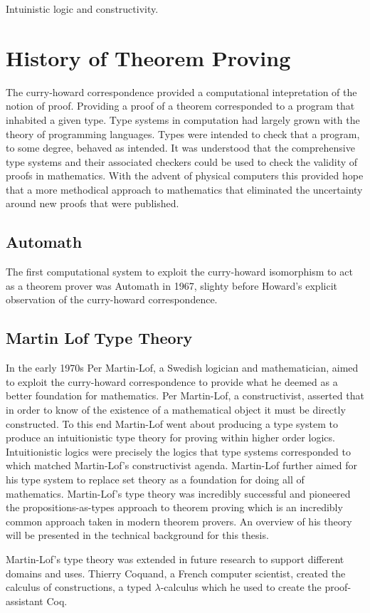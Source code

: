 Intuinistic logic and constructivity.

\section{History of Theorem Proving}
The curry-howard correspondence provided a computational intepretation of the
notion of proof. Providing a proof of a theorem corresponded to a program that
inhabited a given type. Type systems in computation had largely grown with the
theory of programming languages. Types were intended to check that a program, to
some degree, behaved as intended. It was understood that the comprehensive type
systems and their associated checkers could be used to check the validity of
proofs in mathematics. With the advent of physical computers this provided hope
that a more methodical approach to mathematics that eliminated the uncertainty
around new proofs that were published.
\subsection{Automath}
The first computational system to exploit the curry-howard isomorphism to act as
a theorem prover was Automath in 1967, slighty before Howard's explicit
observation of the curry-howard correspondence.
\subsection{Martin Lof Type Theory}
In the early 1970s Per Martin-Lof, a Swedish logician and mathematician, aimed
to exploit the curry-howard correspondence to provide what he deemed as a better
foundation for mathematics. Per Martin-Lof, a constructivist, asserted that in
order to know of the existence of a mathematical object it must be directly
constructed. To this end Martin-Lof went about producing a type system to
produce an intuitionistic type theory for proving within higher order logics.
Intuitionistic logics were precisely the logics that type systems corresponded
to which matched Martin-Lof's constructivist agenda. Martin-Lof further aimed
for his type system to replace set theory as a foundation for doing all of
mathematics. Martin-Lof's type theory was incredibly successful and pioneered
the propositions-as-types approach to theorem proving which is an incredibly
common approach taken in modern theorem provers. An overview of his theory will
be presented in the technical background for this thesis.

Martin-Lof's type theory was extended in future research to support different
domains and uses. Thierry Coquand, a French computer scientist, created the
calculus of constructions, a typed $\lambda$-calculus which he used to create
the proof-assistant Coq.

